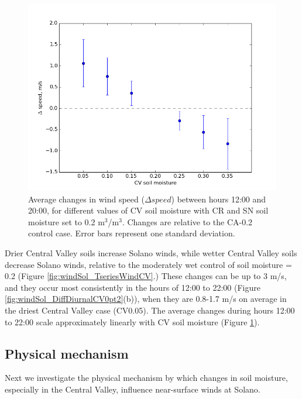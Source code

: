 \begin{figure}[here]
\includegraphics[width=1\textwidth]{ch3-wind/img/shifts_CVsmois_12-20_d02.png}
\caption{Average changes in wind speed ($\Delta speed$) between hours 12:00 and 20:00, for different values of CV soil moisture with CR and SN soil moisture set to 0.2 m$^3$/m$^3$.  Changes are relative to the CA-0.2 control case.  Error bars represent one standard deviation.}
\label{fig:windSol_ShiftsMaxCV}
\end{figure}

Drier Central Valley soils increase Solano winds, while wetter Central Valley soils decrease Solano winds, relative to the moderately wet control of soil moisture = 0.2 (Figure \ref{fig:windSol_TseriesWindCV}.)  These changes can be up to 3 m/s, and they occur most consistently in the hours of 12:00 to 22:00 (Figure \ref{fig:windSol_DiffDiurnalCV0pt2}(b)), when they are 0.8-1.7 m/s on average in the driest Central Valley case (CV0.05).  The average changes during hours 12:00 to 22:00 scale approximately linearly with CV soil moisture (Figure \ref{fig:windSol_ShiftsMaxCV}).


\subsection{Physical mechanism}
\label{subsec:PhysMech}

Next we investigate the physical mechanism by which changes in soil moisture, especially in the Central Valley, influence near-surface winds at Solano.  

